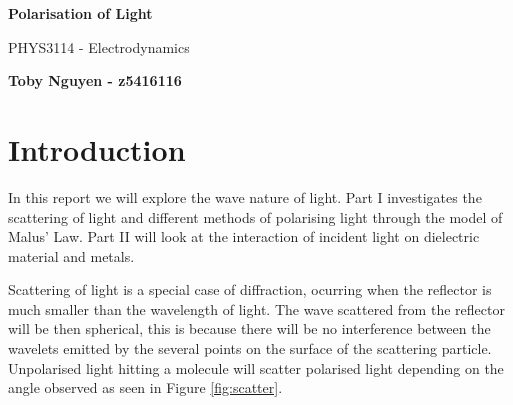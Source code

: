 \documentclass{article}
\begin{document}
\begin{titlepage}
    \begin{center}
        \vspace*{7cm}

        \Huge
        \textbf{Polarisation of Light}

        \vspace{0.5cm}
        \LARGE
        PHYS3114 - Electrodynamics

        \vspace{1.5cm}

        \textbf{Toby Nguyen - z5416116}
    \end{center}
\end{titlepage}

\tableofcontents

\section{Introduction}
In this report we will explore the wave nature of light.
Part I investigates the scattering of light and different 
methods of polarising light through the model of Malus' Law.
Part II will look at the interaction of incident light on 
dielectric material and metals. 

Scattering of light is a special case of diffraction, ocurring 
when the reflector is much smaller than the wavelength of light.
The wave scattered from the reflector will be then spherical, 
this is because there will be no interference between the 
wavelets emitted by the several points on the surface of the 
scattering particle. Unpolarised light hitting a molecule 
will scatter polarised light depending on the angle observed 
as seen in Figure \ref{fig:scatter}.
\end{document}
